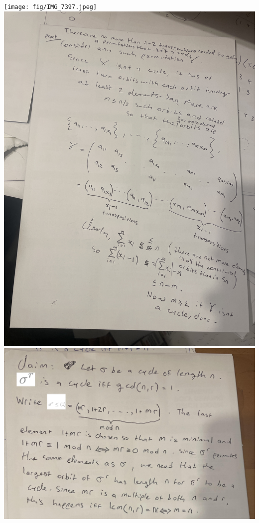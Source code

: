 \begin{center}
\texttt{[image: fig/IMG\_7397.jpeg]}
\includegraphics[scale=0.5, angle=-90]{fig/IMG_7398.jpeg}
\includegraphics[angle=-0, width=\textwidth]{fig/IMG_7432.jpeg}
\end{center}
